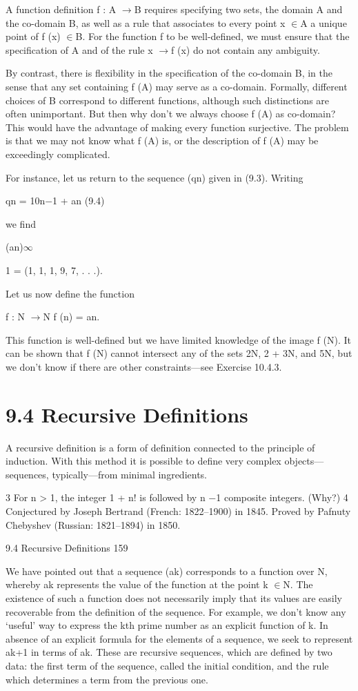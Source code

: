 \documentclass[11pt]{article}
\theoremstyle{plain}
\theoremstyle{definition}
\begin{document}
A function definition f : A $\to$B requires specifying two sets, the domain A and the co-domain B, as well as a rule that associates to every point x $\in$A a unique point of f (x) $\in$B. For the function f to be well-defined, we must ensure that the specification of A and of the rule x $\to$f (x) do not contain any ambiguity.

By contrast, there is flexibility in the specification of the co-domain B, in the sense that any set containing f (A) may serve as a co-domain. Formally, different choices of B correspond to different functions, although such distinctions are often unimportant. But then why don't we always choose f (A) as co-domain? This would have the advantage of making every function surjective. The problem is that we may not know what f (A) is, or the description of f (A) may be exceedingly complicated.

For instance, let us return to the sequence (qn) given in (9.3). Writing

qn = 10n$-$1 + an (9.4)

we find

(an)$\infty$

1 = (1, 1, 1, 9, 7, . . .).

Let us now define the function

f : N $\to$N f (n) = an.

This function is well-defined but we have limited knowledge of the image f (N). It can be shown that f (N) cannot intersect any of the sets 2N, 2 + 3N, and 5N, but we don't know if there are other constraints---see Exercise 10.4.3.

\section{9.4 Recursive Definitions}

A recursive definition is a form of definition connected to the principle of induction. With this method it is possible to define very complex objects---sequences, typically---from minimal ingredients.

3 For n > 1, the integer 1 + n! is followed by n $-$1 composite integers. (Why?) 4 Conjectured by Joseph Bertrand (French: 1822--1900) in 1845. Proved by Pafnuty Chebyshev (Russian: 1821--1894) in 1850.

9.4 Recursive Definitions 159

We have pointed out that a sequence (ak) corresponds to a function over N, whereby ak represents the value of the function at the point k $\in$N. The existence of such a function does not necessarily imply that its values are easily recoverable from the definition of the sequence. For example, we don't know any `useful' way to express the kth prime number as an explicit function of k. In absence of an explicit formula for the elements of a sequence, we seek to represent ak+1 in terms of ak. These are recursive sequences, which are defined by two data: the first term of the sequence, called the initial condition, and the rule which determines a term from the previous one.
\end{document}
